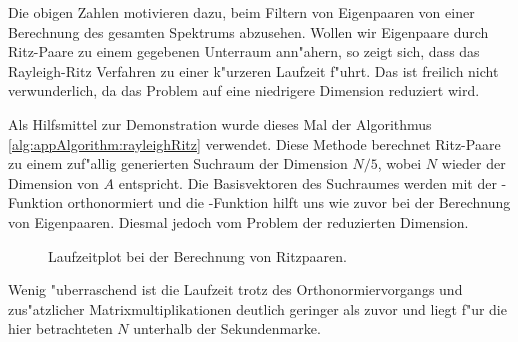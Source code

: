 Die obigen Zahlen motivieren dazu, beim Filtern von Eigenpaaren von einer Berechnung des gesamten Spektrums abzusehen. Wollen wir Eigenpaare durch Ritz-Paare zu einem gegebenen Unterraum ann"ahern, so zeigt sich, dass das Rayleigh-Ritz Verfahren zu einer k"urzeren Laufzeit f"uhrt. Das ist freilich nicht verwunderlich, da das Problem auf eine niedrigere Dimension reduziert wird.

\newpage

Als Hilfsmittel zur Demonstration wurde dieses Mal der Algorithmus \ref{alg:appAlgorithm:rayleighRitz} verwendet. Diese Methode berechnet Ritz-Paare zu einem zuf"allig generierten Suchraum der Dimension $N/5$, wobei $N$ wieder der Dimension von $A$ entspricht. Die Basisvektoren des Suchraumes werden mit der -Funktion orthonormiert und die -Funktion hilft uns wie zuvor bei der Berechnung von Eigenpaaren. Diesmal jedoch vom Problem der reduzierten Dimension.

\begin{figure}[h!]
\centering


\caption{Laufzeitplot bei der Berechnung von Ritzpaaren.}\label{fig:chap5:laufzeitRayleighRitz}
\end{figure}

Wenig "uberraschend ist die Laufzeit trotz des Orthonormiervorgangs und zus"atzlicher Matrixmultiplikationen deutlich geringer als zuvor und liegt f"ur die hier betrachteten $N$ unterhalb der Sekundenmarke.\\

